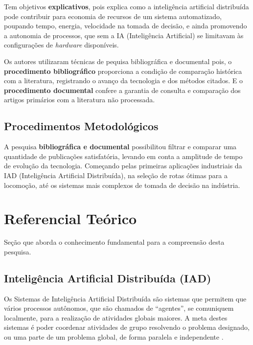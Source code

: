 \documentclass[
	article,			    %
	12pt,				    %
	oneside,			    %
	a4paper,			    %
	chapter=TITLE,		    %
	section=TITLE,		    %
	subsection=TITLE,	    %
	english,			    %
	brazil,				    %
	sumario=tradicional
]{abntex2}
\begin{document}
Tem objetivos \textbf{explicativos}, pois explica como a inteligência artificial distribuída pode contribuir para economia de recursos de um sistema automatizado, poupando tempo, energia, velocidade na tomada de decisão, e ainda promovendo a autonomia de processos, que sem a IA (Inteligência Artificial) se limitavam às configurações de \emph{hardware} disponíveis.

Os autores utilizaram técnicas de pequisa bibliográfica e documental pois, o \textbf{procedimento bibliográfico} proporciona a condição de comparação histórica com a literatura, registrando o avanço da tecnologia e dos métodos citados. E o \textbf{procedimento documental} confere a garantia de consulta e comparação dos artigos primários com a literatura não processada.

\subsection{Procedimentos Metodológicos}
A pesquisa \textbf{bibliográfica e documental} possibilitou filtrar e comparar uma quantidade de publicações satisfatória, levando em conta a amplitude de tempo de evolução da tecnologia. Começando pelas primeiras aplicações industriais da IAD (Inteligência Artificial Distribuída), na seleção de rotas ótimas para a locomoção, até os sistemas mais complexos de tomada de decisão na indústria.

\section{Referencial Teórico}
Seção que aborda o conhecimento fundamental para a compreensão desta pesquisa.
\subsection{Inteligência Artificial Distribuída (IAD)}
Os Sistemas de Inteligência Artificial Distribuída são sistemas que permitem que vários processos autônomos, que são chamados de ``agentes'', se comuniquem localmente, para a realização de atividades globais maiores. A meta destes sistemas é poder coordenar atividades de grupo resolvendo o problema designado, ou uma parte de um problema global, de forma paralela e independente \cite{ufrgsiad}.
\end{document}
